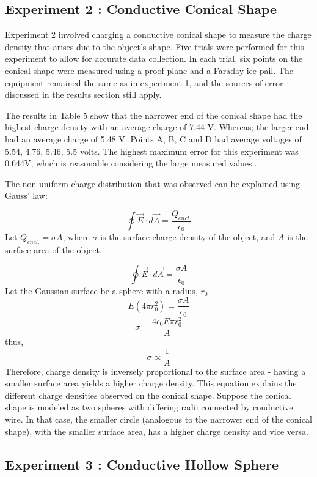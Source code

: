 \newpage

\subsection{Experiment 2 : Conductive Conical Shape}

Experiment 2 involved charging a conductive conical shape to measure the charge density that arises due to the object's shape. Five trials were performed for this experiment to allow for accurate data collection. In each trial, six points on the conical shape were measured using a proof plane and a Faraday ice pail. The equipment remained the same as in experiment  1, and the sources of error discussed in the results section still apply.

The results in Table 5  show that the narrower end of the conical shape had the highest charge density with an average charge of 7.44 V. Whereas; the larger end had an average charge of 5.48 V. Points A, B, C and D had average voltages of 5.54, 4.76, 5.46, 5.5 volts. The highest maximum error for this experiment was 0.644V, which is reasonable considering the large measured values..

The non-uniform charge distribution that was observed can be explained using Gauss’ law:

$$\oint \vec{E} \cdot d\vec{A} = \frac{Q_{encl.}}{\epsilon_{0}}$$
Let $Q_{encl.} = \sigma A$, where $\sigma$ is the surface charge density of the object, and $A$ is the surface area of the object.

$$\oint \vec{E} \cdot d\vec{A} = \frac{\sigma A}{\epsilon_{0}}$$
Let the Gaussian surface be a sphere with a radius, $r_{0}$
$$E(4\pi r_{0}^2) = \frac{\sigma A}{\epsilon_{0}}$$
$$\sigma = \frac{4 \epsilon_{0} E \pi r_{0}^2}{A}  $$
thus, 
$$\sigma  \propto  \frac{1}{A}$$
Therefore, charge density is inversely proportional to the surface area - having a smaller surface area yields a higher charge density. This equation explains the different charge densities observed on the conical shape. Suppose the conical shape is modeled as two spheres with differing radii connected by conductive wire. In that case, the smaller circle (analogous to the narrower end of the conical shape), with the smaller surface area, has a higher charge density and vice versa.

\newpage

\subsection{Experiment 3 : Conductive Hollow Sphere}

